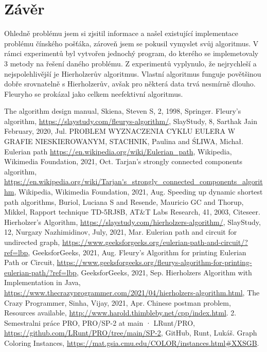 \documentclass[12pt, a4paper]{article}
\begin{document}
\section{Závěr}
Ohledně problému jsem si zjsitil informace a našel existující implementace problému čínského pošťáka, zároveň jsem se pokusil vymyslet svůj algoritmus. V rámci experimentů byl vytvořen jednochý program, do kterého se implemetovaly 3 metody na řešení daného problému. Z experimentů vyplynulo, že nejrychleší a nejspolehlivější je Hierholzerův algoritmus. Vlastní algoritmus funguje povětšinou dobře srovnatelně s Hierholzerův, avšak pro některá data trvá nesmírně dlouho. Fleuryho se prokázal jako celkem neefektivní algoritmus. 

\begin{thebibliography}{9}

		The algorithm design manual,
		Skiena, Steven S,	
		2,
		1998,
		Springer.
	     	Fleury's algorithm,
	     	\url {https://slaystudy.com/fleurys-algorithm/}, 
		SlayStudy, 
		8, Sarthak Jain February, 
		2020, 
		Jul.
		PROBLEM WYZNACZENIA CYKLU EULERA W GRAFIE NIESKIEROWANYM,
		STACHNIK, Paulina and {\'S}LIWA, Micha{\l}.
 	  	 Eulerian path
	  	 \url {https://en.wikipedia.org/wiki/Eulerian_path}, 
	  	 Wikipedia,
	  	 Wikimedia Foundation,
	   	2021, 
	   	Oct.
		Tarjan's strongly connected components algorithm,
		\url {https://en.wikipedia.org/wiki/Tarjan's_strongly_connected_components_algorithm},
		Wikipedia,
		Wikimedia Foundation,
		2021,
		Aug.
		Speeding up dynamic shortest path algorithms,
 		Buriol, Luciana S and Resende, Mauricio GC and Thorup, Mikkel,
		Rapport technique TD-5RJ8B, AT\&T Labs Research,
  		41,
  		2003,
  		Citeseer.
		Hierholzer's Algorithm,
		\url {https://slaystudy.com/hierholzers-algorithm/},
 		SlayStudy,
		12, Nurgazy Nazhimidinov,
		July, 
		2021, 
		Mar.
 		Eulerian path and circuit for undirected graph,
		\url {https://www.geeksforgeeks.org/eulerian-path-and-circuit/?ref=lbp}, 
		GeeksforGeeks, 
		2021,	
		Aug.
		Fleury's Algorithm for printing Eulerian Path or Circuit, 
		\url {https://www.geeksforgeeks.org/fleurys-algorithm-for-printing-eulerian-path/?ref=lbp}, 
		GeeksforGeeks,
		2021, 
		Sep.
		Hierholzers Algorithm with Implementation in Java,
		\url {https://www.thecrazyprogrammer.com/2021/04/hierholzers-algorithm.html},
		The Crazy Programmer, 
		Sinha, Vijay,
		2021,
		Apr.
		Chinese postman problem,
		Resources available, 
		\url {http://www.harold.thimbleby.net/cpp/index.html}.
		2. Semestralni práce PRO,
		PRO/SP-2 at main · LRunt/PRO, 
		\url {https://github.com/LRunt/PRO/tree/main/SP-2}, 
		GitHub, 
		Runt, Lukáš.
		Graph Coloring Instances,
		\url {https://mat.gsia.cmu.edu/COLOR/instances.html#XXSGB}.

 \end{thebibliography}
\end{document}
